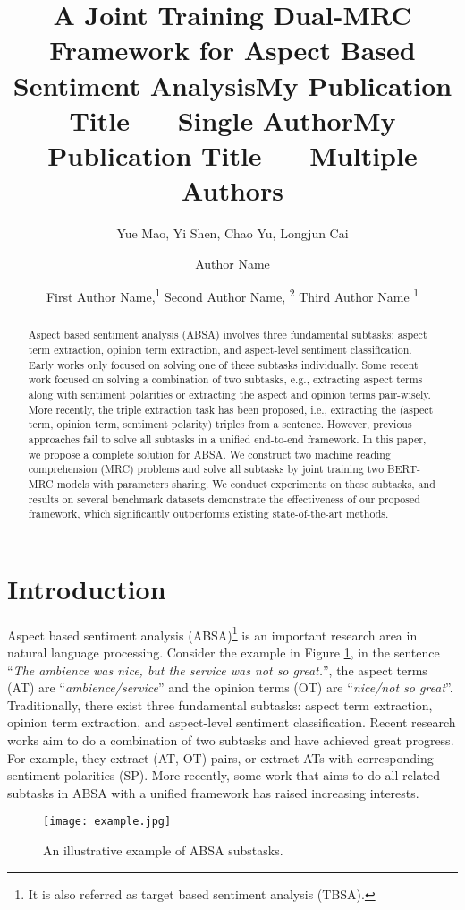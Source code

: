 \documentclass[letterpaper]{article} \usepackage{aaai21}  \usepackage{times}  \usepackage{helvet} \usepackage{courier}  \usepackage[hyphens]{url}  \usepackage{graphicx} \urlstyle{rm} \def\UrlFont{\rm}  \usepackage{natbib}  \usepackage{caption}
\title{A Joint Training Dual-MRC Framework for Aspect Based Sentiment Analysis}
\author{

Yue Mao, Yi Shen, Chao Yu, Longjun Cai
    \\
}
\title{My Publication Title --- Single Author}
\author {
Author Name \\
}
\title{My Publication Title --- Multiple Authors}
\author {


        First Author Name,\textsuperscript{\rm 1}
        Second Author Name, \textsuperscript{\rm 2}
        Third Author Name \textsuperscript{\rm 1} \\
}
\begin{document}
\maketitle

\begin{abstract}
Aspect based sentiment analysis (ABSA) involves three fundamental subtasks: aspect term extraction, opinion term extraction, and aspect-level sentiment classification. 
Early works only focused on solving one of these subtasks individually. 
Some recent work focused on solving a combination of two subtasks, e.g., extracting aspect terms along with sentiment polarities or extracting the aspect and opinion terms pair-wisely. 
More recently, the triple extraction task has been proposed, i.e., extracting the (aspect term, opinion term, sentiment polarity) triples from a sentence. 
However, previous approaches fail to solve all subtasks in a unified end-to-end framework.
In this paper, we propose a complete solution for ABSA. 
We construct two machine reading comprehension (MRC) problems and solve all subtasks by joint training two BERT-MRC models with parameters sharing. 
We conduct experiments on these subtasks, and results on several benchmark datasets demonstrate the effectiveness of our proposed framework,  which significantly outperforms existing state-of-the-art methods.
\end{abstract}



\section{Introduction}
Aspect based sentiment analysis (ABSA)\footnote{It is also referred as target based sentiment analysis (TBSA).} is an important research area in natural language processing.
Consider the example in Figure \ref{example}, in the sentence ``\emph{The ambience was nice, but the service was not so great.}'', 
the aspect terms (AT) are ``\emph{ambience/service}'' and the opinion terms (OT) are ``\emph{nice/not so great}''. Traditionally, there exist three fundamental subtasks: aspect term extraction, opinion term extraction, and aspect-level sentiment classification. 
Recent research works aim to do a combination of two subtasks and have achieved great progress. For example, they extract (AT, OT) pairs, or extract ATs with corresponding sentiment polarities (SP). 
More recently, some work that aims to do all related subtasks in ABSA with a unified framework has raised increasing interests.
\begin{figure}[h]
    \centering
    \texttt{[image: example.jpg]} 
    \caption{An illustrative example of ABSA substasks.} \label{example}
\end{figure}
\end{document}
